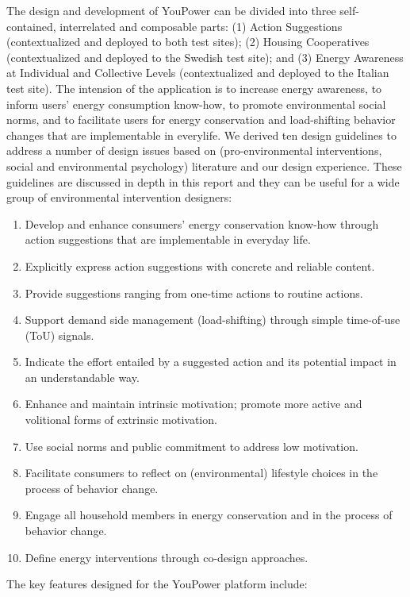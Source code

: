 The design and development of YouPower can be divided into three self-contained, interrelated and composable parts: (1) Action Suggestions (contextualized and deployed to both test sites); (2) Housing Cooperatives (contextualized and deployed to the Swedish test site); and (3) Energy Awareness at Individual and Collective Levels (contextualized and deployed to the Italian test site). The intension of the application is to increase energy awareness, to inform users' energy consumption know-how, to promote environmental social norms, and to facilitate users for energy conservation and load-shifting behavior changes that are implementable in everylife. We derived ten design guidelines to address a number of design issues based on (pro-environmental interventions, social and environmental psychology) literature and our design experience. These guidelines are discussed in depth in this report and they can be useful for a wide group of environmental intervention designers: 
\begin{enumerate}
\item Develop and enhance consumers' energy conservation know-how through action suggestions
that are implementable in everyday life.
\item Explicitly express action suggestions with concrete and reliable content.
\item Provide suggestions ranging from one-time actions to routine actions.
\item Support demand side management (load-shifting) through simple time-of-use (ToU) signals.
\item Indicate the effort entailed by a suggested action and its potential impact in an understandable way.
\item Enhance and maintain intrinsic motivation; promote more active and volitional forms
of extrinsic motivation.
\item Use social norms and public commitment to address low motivation.
\item Facilitate consumers to reflect on (environmental) lifestyle choices in the process
of behavior change.
\item Engage all household members in energy conservation and in the process of behavior change.
\item Define energy interventions through co-design approaches.
\end{enumerate}

The key features designed for the YouPower platform include: 

